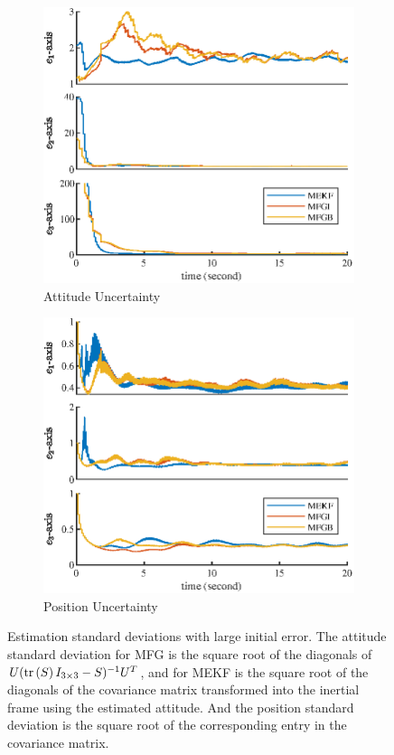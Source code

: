 \begin{figure}
	\centering
	\begin{subfigure}{\textwidth}
		\centering
		\includegraphics[scale=1.15]{figures/posEst-std-att}
		\caption{Attitude Uncertainty}
		\label{fig:posEst-std-att}
	\end{subfigure}
	\begin{subfigure}{\textwidth}
		\centering
		\includegraphics[scale=1.15]{figures/posEst-std-pos}
		\caption{Position Uncertainty}
		\label{fig:posEst-std-pos}
	\end{subfigure}
	\caption[Estimation standard deviations with large initial error.]{Estimation standard deviations with large initial error.
		The attitude standard deviation for MFG is the square root of the diagonals of $U(\mathrm{tr}\left( S \right)I_{3\times 3}-S)^{-1}U^T$, and for MEKF is the square root of the diagonals of the covariance matrix transformed into the inertial frame using the estimated attitude.
		And the position standard deviation is the square root of the corresponding entry in the covariance matrix.}
	\label{fig:posEst-std}
\end{figure}

